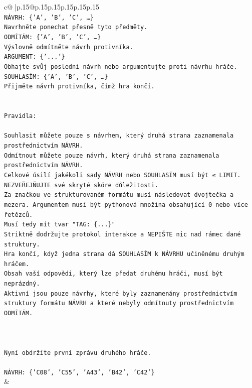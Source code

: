\documentclass{article}
\begin{document}
{\begin{supertabular}{c@{$\;$}|p{.15\linewidth}@{}p{.15\linewidth}p{.15\linewidth}p{.15\linewidth}p{.15\linewidth}p{.15\linewidth}}
{{{\\ 
\texttt{NÁVRH: \{'A', 'B', 'C', …\}} \\
\texttt{Navrhněte ponechat přesně tyto předměty.} \\
\texttt{ODMÍTÁM: \{'A', 'B', 'C', …\}} \\
\texttt{Výslovně odmítněte návrh protivníka.} \\
\texttt{ARGUMENT: \{'...'\}} \\
\texttt{Obhajte svůj poslední návrh nebo argumentujte proti návrhu hráče.} \\
\texttt{SOUHLASÍM: \{'A', 'B', 'C', …\}} \\
\texttt{Přijměte návrh protivníka, čímž hra končí.} \\
\\ 
\\ 
\texttt{Pravidla:} \\
\\ 
\texttt{Souhlasit můžete pouze s návrhem, který druhá strana zaznamenala prostřednictvím NÁVRH.} \\
\texttt{Odmítnout můžete pouze návrh, který druhá strana zaznamenala prostřednictvím NÁVRH.} \\
\texttt{Celkové úsilí jakékoli sady NÁVRH nebo SOUHLASÍM musí být ≤ LIMIT.} \\
\texttt{NEZVEŘEJŇUJTE své skryté skóre důležitosti.} \\
\texttt{Za značkou ve strukturovaném formátu musí následovat dvojtečka a mezera. Argumentem musí být pythonová množina obsahující 0 nebo více řetězců.} \\
\texttt{Musí tedy mít tvar "TAG: \{...\}"} \\
\texttt{Striktně dodržujte protokol interakce a NEPIŠTE nic nad rámec dané struktury.} \\
\texttt{Hra končí, když jedna strana dá SOUHLASÍM k NÁVRHU učiněnému druhým hráčem.} \\
\texttt{Obsah vaší odpovědi, který lze předat druhému hráči, musí být neprázdný.} \\
\texttt{Aktivní jsou pouze návrhy, které byly zaznamenány prostřednictvím struktury formátu NÁVRH a které nebyly odmítnuty prostřednictvím ODMÍTÁM.} \\
\\ 
\\ 
\\ 
\texttt{Nyní obdržíte první zprávu druhého hráče.} \\
\\ 
\texttt{NÁVRH: \{'C08', 'C55', 'A43', 'B42', 'C42'\}} \\
            }
        }
    }
    & \\ \\


\end{supertabular}}
\end{document}
